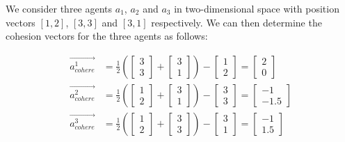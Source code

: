 \documentclass[12pt]{article}
\begin{document}
We consider three agents $a_1$, $a_2$ and $a_3$ in two-dimensional space with position vectors $[1,2]$, $[3,3]$ and $[3,1]$ respectively. We can then determine the cohesion vectors for the three agents as follows:

\begin{equation}
    \begin{aligned}
        \vec{a_{cohere}^1} &= \frac{1}{2} \left( \begin{bmatrix} 3 \\ 3 \end{bmatrix} + \begin{bmatrix} 3 \\ 1 \end{bmatrix} \right) - \begin{bmatrix} 1 \\ 2 \end{bmatrix} = \begin{bmatrix} 2 \\ 0 \end{bmatrix}
        \\
        \vec{a_{cohere}^2} &= \frac{1}{2} \left( \begin{bmatrix} 1 \\ 2 \end{bmatrix} + \begin{bmatrix} 3 \\ 1 \end{bmatrix} \right) - \begin{bmatrix} 3 \\ 3 \end{bmatrix} = \begin{bmatrix} -1 \\ -1.5 \end{bmatrix}
        \\
        \vec{a_{cohere}^3} &= \frac{1}{2} \left( \begin{bmatrix} 1 \\ 2 \end{bmatrix} + \begin{bmatrix} 3 \\ 3 \end{bmatrix} \right) - \begin{bmatrix} 3 \\ 1 \end{bmatrix} = \begin{bmatrix} -1 \\ 1.5 \end{bmatrix}
    \end{aligned}
\end{equation}
\end{document}
